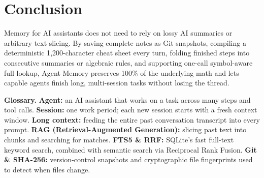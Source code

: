 \documentclass[11pt,a4paper]{article}
\begin{document}
\section{Conclusion}

Memory for AI assistants does not need to rely on lossy AI summaries or arbitrary text slicing. By saving complete notes as Git snapshots, compiling a deterministic 1{,}200-character cheat sheet every turn, folding finished steps into consecutive summaries or algebraic rules, and supporting one-call symbol-aware full lookup, Agent Memory preserves 100\% of the underlying math and lets capable agents finish long, multi-session tasks without losing the thread.

\begin{glossarybox}
\textbf{Glossary.}
\textbf{Agent:} an AI assistant that works on a task across many steps and tool calls.
\textbf{Session:} one work period; each new session starts with a fresh context window.
\textbf{Long context:} feeding the entire past conversation transcript into every prompt.
\textbf{RAG (Retrieval-Augmented Generation):} slicing past text into chunks and searching for matches.
\textbf{FTS5 \& RRF:} SQLite's fast full-text keyword search, combined with semantic search via Reciprocal Rank Fusion.
\textbf{Git \& SHA-256:} version-control snapshots and cryptographic file fingerprints used to detect when files change.
\end{glossarybox}
\end{document}

